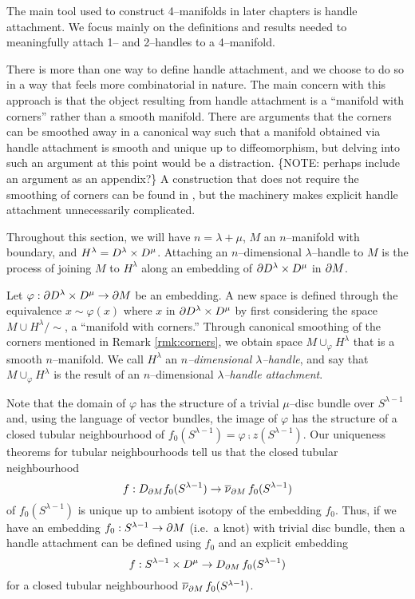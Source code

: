 The main tool used to construct 4--manifolds in later chapters is handle attachment.
We focus mainly on the definitions and results needed to meaningfully attach 1-- and 2--handles to a 4--manifold.

\begin{rmk}
	\label{rmk:corners}
	There is more than one way to define handle attachment, and we choose to do so in a way that feels more combinatorial in nature.
	The main concern with this approach is that the object resulting from handle attachment is a ``manifold with corners'' rather than a smooth manifold.
	There are arguments that the corners can be smoothed away in a canonical way such that a manifold obtained via handle attachment is smooth and unique up to diffeomorphism, but delving into such an argument at this point would be a distraction.
	\{NOTE: perhaps include an argument as an appendix?\}
	A construction that does not require the smoothing of corners can be found in \cite{Kosi93}, but the machinery makes explicit handle attachment unnecessarily complicated.
\end{rmk}

Throughout this section, we will have $n=\lambda+\mu$, $M$ an $n$--manifold with boundary, and $H^\lambda=D^\lambda\times D^\mu$.
Attaching an $n$--dimensional $\lambda$--handle to $M$ is the process of joining $M$ to $H^\lambda$ along an embedding of $\partial D^\lambda\times D^\mu$ in $\partial M$.

\begin{defn}[Handle]
	\label{def:handle}
	Let $\varphi:\partial D^\lambda\times D^\mu\to\partial M$ be an embedding.
	A new space is defined through the equivalence $x\sim \varphi(x)$ where $x$ in $\partial D^\lambda\times D^\mu$ by first considering the space $M\cup H^\lambda/\sim$, a ``manifold with corners.''
	Through canonical smoothing of the corners mentioned in Remark \ref{rmk:corners}, we obtain space $M\cup_\varphi H^\lambda$ that is a smooth $n$--manifold.
	We call $H^\lambda$ an \emph{$n$--dimensional $\lambda$--handle}, and say that $M\cup_\varphi H^\lambda$ is the result of an $n$--dimensional \emph{$\lambda$--handle attachment}.
\end{defn}

Note that the domain of $\varphi$ has the structure of a trivial $\mu$--disc bundle over $S^{\lambda-1}$ and, using the language of vector bundles, the image of $\varphi$ has the structure of a closed tubular neighbourhood of $f_0(S^{\lambda-1})=\varphi\comp z(S^{\lambda-1})$.
Our uniqueness theorems for tubular neighbourhoods tell us that the closed tubular neighbourhood
\[
	f:D_{\partial M}f_0(S^{\lambda-1})\to\overline{\nu}_{\partial M}\,f_0(S^{\lambda-1})
\]
of $f_0(S^{\lambda-1})$ is unique up to ambient isotopy of the embedding $f_0$.
Thus, if we have an embedding $f_0:S^{\lambda-1}\to \partial M$ (i.e.\ a knot) with trivial disc bundle, then a handle attachment can be defined using $f_0$ and an explicit embedding 
\[
	f: S^{\lambda-1}\times D^\mu\to D_{\partial M}\,f_0(S^{\lambda-1})
\]
for a closed tubular neighbourhood $\overline{\nu}_{\partial M}\,f_0(S^{\lambda-1})$.

